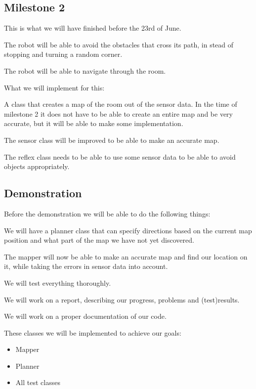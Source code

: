 \subsection*{Milestone 2}
This is what we will have finished before the 23rd of June.
\begin{description}
\addtolength{\itemsep}{-0.5\baselineskip}
\item[Avoid obstacles:] The robot will be able to avoid the obstacles that
cross its path, in stead of stopping and turning a random corner.
\item[Navigate:] The robot will be able to navigate through the room.
\end{description}

What we will implement for this:
\begin{description}
\addtolength{\itemsep}{-0.5\baselineskip}
\item[Mapper:] A class that creates a map of the room out of the sensor
data. In the time of milestone 2 it does not have to be able to create an entire
map and be very accurate, but it will be able to make some implementation.
\item[Improved Sensor:] The sensor class will be improved to be able to make
an accurate map.
\item[Improved Reflexes:] The reflex class needs to be able to use some
sensor data to be able to avoid objects appropriately. 
\end{description}


\subsection*{Demonstration}
Before the demonstration we will be able to do the following things:
\begin{description}
\addtolength{\itemsep}{-0.5\baselineskip}
\item[Planner:] We will have a planner class that can specify directions
based on the current map position and what part of the map we have not yet
discovered.
\item[Improved Mapper:] The mapper will now be able to make an accurate map
and find our location on it, while taking the errors in sensor data into account.
\item[Tests:] We will test everything thoroughly.
\item[Report:] We will work on a report, describing our progress, problems
and (test)results.
\item[Documentation:] We will work on a proper documentation of our code.
\end{description}

These classes we will be implemented to achieve our goals:
\begin{itemize}
\item Mapper
\item Planner
\item All test classes
\end{itemize}
